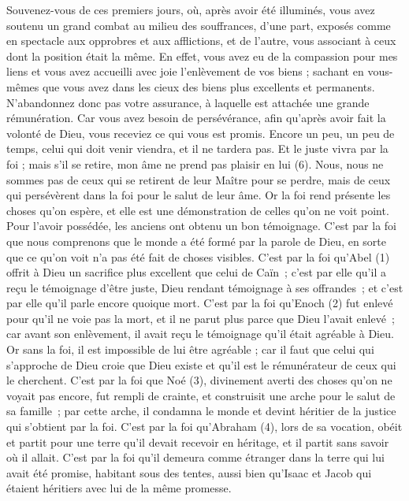 \begin{multicols}{2}
Souvenez-vous de ces premiers jours, où, après avoir été illuminés, vous avez soutenu un grand combat au milieu des souffrances,
d'une part, exposés comme en spectacle aux opprobres et aux afflictions, et de l'autre, vous associant à ceux dont la position était la même.
En effet, vous avez eu de la compassion pour mes liens et vous avez accueilli avec joie l'enlèvement de vos biens ; sachant en vous-mêmes que vous avez dans les cieux des biens plus excellents et permanents.
N’abandonnez donc pas votre assurance, à laquelle est attachée une grande rémunération.
Car vous avez besoin de persévérance, afin qu'après avoir fait la volonté de Dieu, vous receviez ce qui vous est promis.
Encore un peu, un peu de temps, celui qui doit venir viendra, et il ne tardera pas.
Et le juste vivra par la foi ; mais s’il se retire, mon âme ne prend pas plaisir en lui (6).
Nous, nous ne sommes pas de ceux qui se retirent de leur Maître pour se perdre, mais de ceux qui persévèrent dans la foi pour le salut de leur âme.
\VerseOne{}Or la foi rend présente les choses qu'on espère, et elle est une démonstration de celles qu'on ne voit point.
Pour l’avoir possédée, les anciens ont obtenu un bon témoignage.
C’est par la foi que nous comprenons que le monde a été formé par la parole de Dieu, en sorte que ce qu’on voit n’a pas été fait de choses visibles.
C’est par la foi qu’Abel (1) offrit à Dieu un sacrifice plus excellent que celui de Caïn ; c’est par elle qu’il a reçu le témoignage d’être juste, Dieu rendant témoignage à ses offrandes ; et c’est par elle qu’il parle encore quoique mort.
C’est par la foi qu’Enoch (2) fut enlevé pour qu’il ne voie pas la mort, et il ne parut plus parce que Dieu l’avait enlevé ; car avant son enlèvement, il avait reçu le témoignage qu’il était agréable à Dieu.
Or sans la foi, il est impossible de lui être agréable ; car il faut que celui qui s’approche de Dieu croie que Dieu existe et qu'il est le rémunérateur de ceux qui le cherchent.
C’est par la foi que Noé (3), divinement averti des choses qu’on ne voyait pas encore, fut rempli de crainte, et construisit une arche pour le salut de sa famille ; par cette arche, il condamna le monde et devint héritier de la justice qui s’obtient par la foi.
C’est par la foi qu’Abraham (4), lors de sa vocation, obéit et partit pour une terre qu'il devait recevoir en héritage, et il partit sans savoir où il allait.
C’est par la foi qu’il demeura comme étranger dans la terre qui lui avait été promise, habitant sous des tentes, aussi bien qu’Isaac et Jacob qui étaient héritiers avec lui de la même promesse.

\end{multicols}
